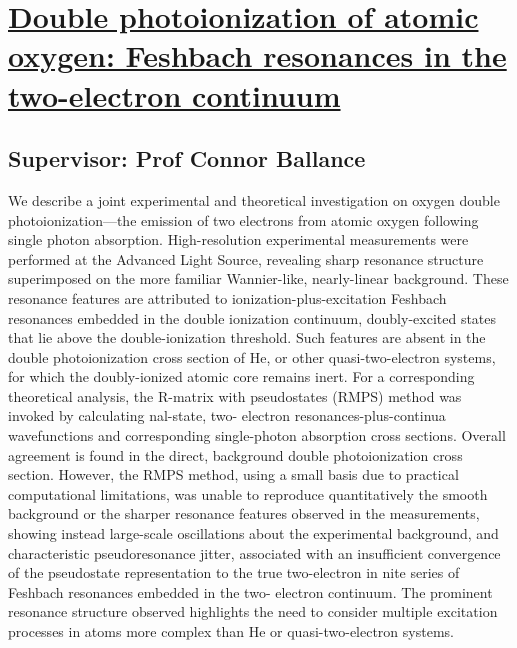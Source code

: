 \section{\href{https://doi.org/10.1088/1402-4896/abf18b}{Double photoionization of atomic oxygen: Feshbach resonances in the two-electron continuum
}}

\subsection*{Supervisor: Prof Connor Ballance}

We describe a joint experimental and theoretical investigation on oxygen double photoionization—the
emission of two electrons from atomic oxygen following single photon absorption. High-resolution
experimental measurements were performed at the Advanced Light Source, revealing sharp resonance
structure superimposed on the more familiar Wannier-like, nearly-linear background. These resonance
features are attributed to ionization-plus-excitation Feshbach resonances embedded in the double
ionization continuum, doubly-excited states that lie above the double-ionization threshold. Such
features are absent in the double photoionization cross section of He, or other quasi-two-electron
systems, for which the doubly-ionized atomic core remains inert. For a corresponding theoretical
analysis, the R-matrix with pseudostates (RMPS) method was invoked by calculating nal-state, two-
electron resonances-plus-continua wavefunctions and corresponding single-photon absorption cross
sections. Overall agreement is found in the direct, background double photoionization cross section.
However, the RMPS method, using a small basis due to practical computational limitations, was unable
to reproduce quantitatively the smooth background or the sharper resonance features observed in the
measurements, showing instead large-scale oscillations about the experimental background, and
characteristic pseudoresonance jitter, associated with an insufficient convergence of the pseudostate
representation to the true two-electron in nite series of Feshbach resonances embedded in the two-
electron continuum. The prominent resonance structure observed highlights the need to consider
multiple excitation processes in atoms more complex than He or quasi-two-electron systems.
